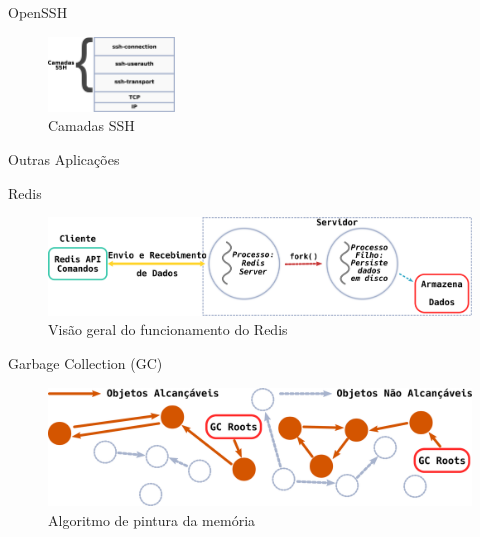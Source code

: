 \documentclass[xcolor={usenames,svgnames,dvipsnames},brazil,english,12pt,aspectratio=149]{beamer}
\begin{document}
\begin{frame}{OpenSSH}
  \begin{figure}[!h]
    \centering
    \includegraphics[width=0.3\textwidth]{ssh_layers}
    \caption{Camadas SSH}
    \label{fig:openssh_layer}
  \end{figure}
\end{frame}

\begin{frame}{Outras Aplicações}
\end{frame}

\begin{frame}{Redis}
  \begin{figure}[!h]
    \centering
    \includegraphics[width=\textwidth]{redis_overview}
    \caption{Visão geral do funcionamento do Redis}
    \label{fig:redis}
  \end{figure}
\end{frame}

\begin{frame}{Garbage Collection (GC)}
  \begin{figure}[!h]
    \centering
    \includegraphics[width=\textwidth]{gc_algoritmo}
    \caption{Algoritmo de pintura da memória}
    \label{fig:gc_alg}
  \end{figure}
\end{frame}
\end{document}
